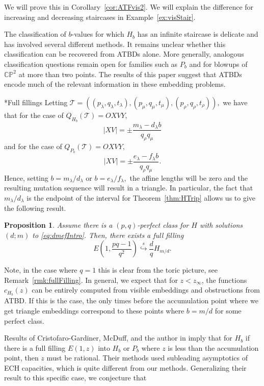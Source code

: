 \documentclass[11pt, reqno]{amsart}
\makeatletter
\def\subsubsection{\@startsection{subsubsection}{3}%
  \z@{.5\linespacing\@plus.7\linespacing}{-.5em}%
  {\normalfont\bfseries}}
\newtheorem{prop}[thm]{Proposition}
\theoremstyle{remark}
\numberwithin{equation}{subsection}
\numberwithin{figure}{section}
\theoremstyle{customremark}
\newcommand{\Tt}{\mathcal{T}}
\newcommand{\la}{{\lambda}}
\newcommand{\CP}{\mathbb{CP}}
\newcommand{\sembeds}{\stackrel{s}{\hookrightarrow}}
\makeatother
\begin{document}
We will prove this in Corollary~\ref{cor:ATFvis2}. We will explain the difference for increasing and decreasing staircases in Example~\ref{ex:visStair}. 

The classification of \(b\)-values for which \(H_b\) has an infinite staircase is delicate and has involved several different methods. It remains unclear whether this classification can be recovered from ATBDs
alone. More generally, analogous classification questions remain open for families such as \(P_b\) and for blowups of \(\CP^2\) at more than two
points. The results of this paper suggest that ATBDs encode much of the relevant information in these embedding problems.

\subsubsection*{Full fillings}
Letting $\Tt=((p_\la,q_\la,t_\la),(p_\mu,q_\mu,t_\mu),(p_\rho,q_\rho,t_\rho)),$ we have that for the case of $Q_{H_b}(\Tt)=OXVY$, 
\[ |XV|=\pm \frac{m_\la-d_\la b}{q_\rho q_\mu}\]
and for the case of $Q_{P_b}(\Tt)=OXVY,$
\[ |XV|=\pm \frac{e_\la-f_\la b}{q_\rho q_\mu}.\]
Hence, setting $b=m_\la/d_\la$ or $b=e_\la/f_\la,$ the affine lengths will be zero and the resulting mutation sequence will result in a triangle. In particular, the fact that $m_\la/d_\la$ is the endpoint of the interval for Theorem~\ref{thm:HTrip} allows us to give the following result. 

\begin{prop}\label{prop:fullFilling}
    Assume there is a $(p,q)$-perfect class for $H$ with solutions $(d;m)$ to \eqref{eq:dmefIntro}. Then, there exists a full filling 
     \[ E\left(1,\frac{pq-1}{q^2}\right) \sembeds \frac{d}{q}H_{m/d}.\] 
\end{prop}

Note, in the case where $q=1$ this is clear from the toric picture, see Remark~\ref{rmk:fullFilling}. In general, we expect that for $z < z_\infty$, the functions $c_{H_b}(z)$ can be entirely computed from visible embeddings and obstructions from ATBD. If this is the case, the only times before the accumulation point where we get triangle embeddings correspond to these points where $b=m/d$ for some perfect class. 

Results of Cristofaro-Gardiner, McDuff, and the author in \cite[Corollary 1.2.7]{CGMM} imply that for $H_b$ if there is a full filling $E(1,z)$ into $H_b$ or $P_b$ where $z$ is less than the accumulation point, then $z$ must be rational. Their methods used subleading asymptotics of ECH capacities, which is quite different from our methods. Generalizing their result to this specific case, we conjecture that 
\end{document}

